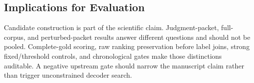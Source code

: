 \subsection{Implications for Evaluation}

Candidate construction is part of the scientific claim. Judgment-packet, full-corpus, and perturbed-packet results answer different questions and should not be pooled. Complete-gold scoring, raw ranking preservation before label joins, strong fixed/threshold controls, and chronological gates make those distinctions auditable. A negative upstream gate should narrow the manuscript claim rather than trigger unconstrained decoder search.
